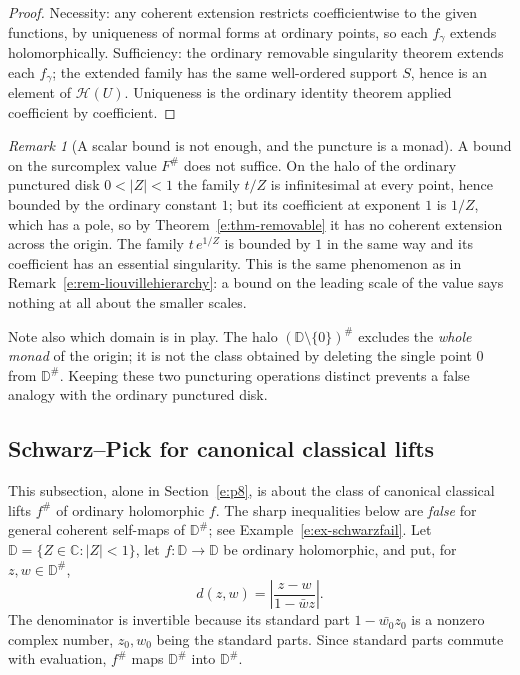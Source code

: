 \documentclass[11pt,a4paper]{article}
\numberwithin{equation}{section}
\theoremstyle{definition}
\theoremstyle{remark}
\newtheorem{remark}[theorem]{Remark}
\theoremstyle{plain}
\newcommand{\CC}{\mathbb C}
\newcommand{\tm}{t}
\newcommand{\halo}[1]{#1^{\#}}
\newcommand{\ev}[1]{#1^{\#}}
\newcommand{\Hc}{\mathcal H}
\newcommand{\abs}[1]{\lvert #1\rvert}
\begin{document}
\begin{proof}
Necessity: any coherent extension restricts coefficientwise to the given
functions, by uniqueness of normal forms at ordinary points, so each
$f_\gamma$ extends holomorphically.  Sufficiency: the ordinary removable
singularity theorem extends each $f_\gamma$; the extended family has the
same well-ordered support $S$, hence is an element of $\Hc(U)$.
Uniqueness is the ordinary identity theorem applied coefficient by
coefficient.
\end{proof}

\begin{remark}[A scalar bound is not enough, and the puncture is a monad]
\label{e:rem-punctured}
A bound on the surcomplex value $\ev F$ does not suffice.  On the halo of
the ordinary punctured disk $0<\abs Z<1$ the family $\tm/Z$ is
infinitesimal at every point, hence bounded by the ordinary constant $1$;
but its coefficient at exponent $1$ is $1/Z$, which has a pole, so by
Theorem~\ref{e:thm-removable} it has no coherent extension across the
origin.  The family $\tm\,e^{1/Z}$ is bounded by $1$ in the same way and
its coefficient has an essential singularity.  This is the same
phenomenon as in Remark~\ref{e:rem-liouvillehierarchy}: a bound on the
leading scale of the value says nothing at all about the smaller scales.

Note also which domain is in play.  The halo
$\halo{(\mathbb D\setminus\{0\})}$ excludes the \emph{whole monad} of the
origin; it is not the class obtained by deleting the single point $0$ from
$\halo{\mathbb D}$.  Keeping these two puncturing operations distinct
prevents a false analogy with the ordinary punctured disk.
\end{remark}

\subsection{Schwarz--Pick for canonical classical lifts}\label{e:sec-schwarz}

This subsection, alone in Section~\ref{e:p8}, is about the class of canonical
classical lifts $\ev f$ of ordinary holomorphic $f$.  The sharp
inequalities below are \emph{false} for general coherent self-maps of
$\halo{\mathbb D}$; see Example~\ref{e:ex-schwarzfail}.  Let
$\mathbb D=\{Z\in\CC:\abs Z<1\}$, let $f:\mathbb D\to\mathbb D$ be
ordinary holomorphic, and put, for $z,w\in\halo{\mathbb D}$,
\[
 d(z,w)=\left\lvert\frac{z-w}{1-\bar wz}\right\rvert .
\]
The denominator is invertible because its standard part $1-\bar{w_0}z_0$
is a nonzero complex number, $z_0,w_0$ being the standard parts.  Since
standard parts commute with evaluation, $\ev f$ maps $\halo{\mathbb D}$
into $\halo{\mathbb D}$.
\end{document}
